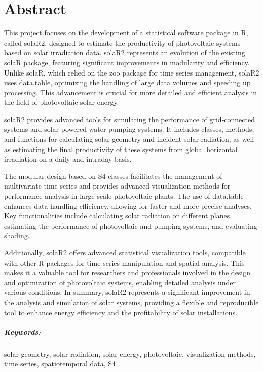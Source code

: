 \chapter*{Abstract}
This project focuses on the development of a statistical software package in R, called solaR2, designed to estimate the productivity of photovoltaic systems based on solar irradiation data. solaR2 represents an evolution of the existing solaR package, featuring significant improvements in modularity and efficiency. Unlike solaR, which relied on the zoo package for time series management, solaR2 uses data.table, optimizing the handling of large data volumes and speeding up processing. This advancement is crucial for more detailed and efficient analysis in the field of photovoltaic solar energy.

solaR2 provides advanced tools for simulating the performance of grid-connected systems and solar-powered water pumping systems. It includes classes, methods, and functions for calculating solar geometry and incident solar radiation, as well as estimating the final productivity of these systems from global horizontal irradiation on a daily and intraday basis.

The modular design based on S4 classes facilitates the management of multivariate time series and provides advanced visualization methods for performance analysis in large-scale photovoltaic plants. The use of data.table enhances data handling efficiency, allowing for faster and more precise analyses. Key functionalities include calculating solar radiation on different planes, estimating the performance of photovoltaic and pumping systems, and evaluating shading.

Additionally, solaR2 offers advanced statistical visualization tools, compatible with other R packages for time series manipulation and spatial analysis. This makes it a valuable tool for researchers and professionals involved in the design and optimization of photovoltaic systems, enabling detailed analysis under various conditions. In summary, solaR2 represents a significant improvement in the analysis and simulation of solar systems, providing a flexible and reproducible tool to enhance energy efficiency and the profitability of solar installations.

\paragraph{Keywords:}
solar geometry, solar radiation, solar energy, photovoltaic, visualization methods, time series, spatiotemporal data, S4
